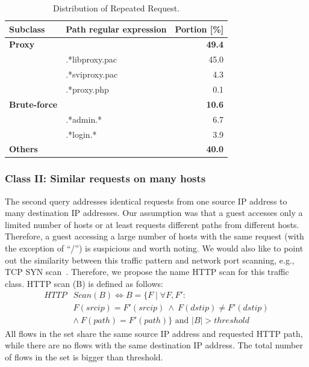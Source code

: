 \begin{table}[ht]
\centering
\begin{tabular}{l l r}
Subclass & Path regular expression & Portion [\%] \\
\hline
\textbf{Proxy} & & \textbf{49.4} \\
& .*libproxy.pac & 45.0 \\
& .*sviproxy.pac &  4.3 \\
& .*proxy.php    &  0.1 \\
\hline
\textbf{Brute-force} & & \textbf{10.6} \\
& .*admin.*            &  6.7 \\
& .*login.*            &  3.9 \\
\hline
\textbf{Others} & & \textbf{40.0} \\
\end{tabular}
\caption{Distribution of Repeated Request.}
\label{tab:httpsecurity-repeat-statistics}
\end{table}

\subsubsection{Class II: Similar requests on many hosts}

The second query addresses identical requests from one source IP address to many destination IP addresses. Our assumption was that a guest accesses only a limited number of hosts or at least requests different paths from different hosts. Therefore, a guest accessing a large number of hosts with the same request (with the exception of ``/'') is suspicious and worth noting. We would also like to point out the similarity between this traffic pattern and network port scanning, e.g., TCP SYN scan~\cite{Bhuyan-2011-Surveying}. Therefore, we propose the name HTTP scan for this traffic class. HTTP scan (B) is defined as follows:
\begin{equation*}
\begin{split}
HTTP&Scan(B) \iff B = \{F \mid \forall F, F':\\
&F(srcip) = F'(srcip) \: \land \: F(dstip) \neq F'(dstip)\\
&\land \: F(path) = F'(path) \} \mbox{ and } |B| > threshold
\end{split}
\end{equation*}
All flows in the set share the same source IP address and requested HTTP path, while there are no flows with the same destination IP address. The total number of flows in the set is bigger than threshold.

